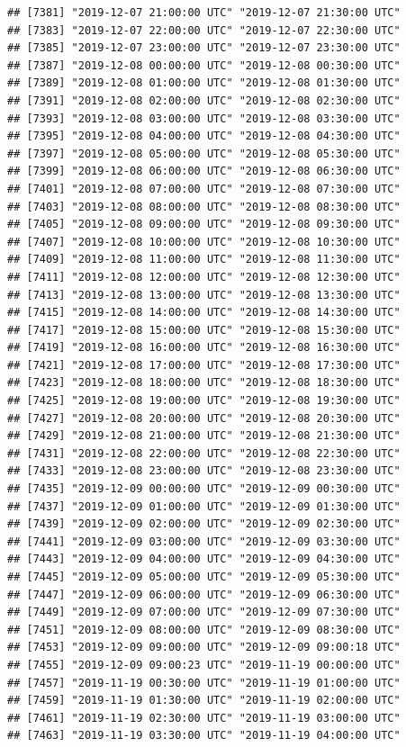 \documentclass{article}\usepackage[]{graphicx}\usepackage[]{color}
\makeatletter
\newenvironment{kframe}{%
 \def\at@end@of@kframe{}%
 \ifinner\ifhmode%
  \def\at@end@of@kframe{\end{minipage}}%
  \begin{minipage}{\columnwidth}%
 \fi\fi%
 \def\FrameCommand##1{\hskip\@totalleftmargin \hskip-\fboxsep
 \colorbox{shadecolor}{##1}\hskip-\fboxsep
     \hskip-\linewidth \hskip-\@totalleftmargin \hskip\columnwidth}%
 \MakeFramed {\advance\hsize-\width
   \@totalleftmargin\z@ \linewidth\hsize
   \@setminipage}}%
 {\par\unskip\endMakeFramed%
 \at@end@of@kframe}
\newenvironment{knitrout}{}{} %
\makeatother
\begin{document}
\begin{knitrout}
\begin{kframe}
\begin{verbatim}
## [7381] "2019-12-07 21:00:00 UTC" "2019-12-07 21:30:00 UTC"
## [7383] "2019-12-07 22:00:00 UTC" "2019-12-07 22:30:00 UTC"
## [7385] "2019-12-07 23:00:00 UTC" "2019-12-07 23:30:00 UTC"
## [7387] "2019-12-08 00:00:00 UTC" "2019-12-08 00:30:00 UTC"
## [7389] "2019-12-08 01:00:00 UTC" "2019-12-08 01:30:00 UTC"
## [7391] "2019-12-08 02:00:00 UTC" "2019-12-08 02:30:00 UTC"
## [7393] "2019-12-08 03:00:00 UTC" "2019-12-08 03:30:00 UTC"
## [7395] "2019-12-08 04:00:00 UTC" "2019-12-08 04:30:00 UTC"
## [7397] "2019-12-08 05:00:00 UTC" "2019-12-08 05:30:00 UTC"
## [7399] "2019-12-08 06:00:00 UTC" "2019-12-08 06:30:00 UTC"
## [7401] "2019-12-08 07:00:00 UTC" "2019-12-08 07:30:00 UTC"
## [7403] "2019-12-08 08:00:00 UTC" "2019-12-08 08:30:00 UTC"
## [7405] "2019-12-08 09:00:00 UTC" "2019-12-08 09:30:00 UTC"
## [7407] "2019-12-08 10:00:00 UTC" "2019-12-08 10:30:00 UTC"
## [7409] "2019-12-08 11:00:00 UTC" "2019-12-08 11:30:00 UTC"
## [7411] "2019-12-08 12:00:00 UTC" "2019-12-08 12:30:00 UTC"
## [7413] "2019-12-08 13:00:00 UTC" "2019-12-08 13:30:00 UTC"
## [7415] "2019-12-08 14:00:00 UTC" "2019-12-08 14:30:00 UTC"
## [7417] "2019-12-08 15:00:00 UTC" "2019-12-08 15:30:00 UTC"
## [7419] "2019-12-08 16:00:00 UTC" "2019-12-08 16:30:00 UTC"
## [7421] "2019-12-08 17:00:00 UTC" "2019-12-08 17:30:00 UTC"
## [7423] "2019-12-08 18:00:00 UTC" "2019-12-08 18:30:00 UTC"
## [7425] "2019-12-08 19:00:00 UTC" "2019-12-08 19:30:00 UTC"
## [7427] "2019-12-08 20:00:00 UTC" "2019-12-08 20:30:00 UTC"
## [7429] "2019-12-08 21:00:00 UTC" "2019-12-08 21:30:00 UTC"
## [7431] "2019-12-08 22:00:00 UTC" "2019-12-08 22:30:00 UTC"
## [7433] "2019-12-08 23:00:00 UTC" "2019-12-08 23:30:00 UTC"
## [7435] "2019-12-09 00:00:00 UTC" "2019-12-09 00:30:00 UTC"
## [7437] "2019-12-09 01:00:00 UTC" "2019-12-09 01:30:00 UTC"
## [7439] "2019-12-09 02:00:00 UTC" "2019-12-09 02:30:00 UTC"
## [7441] "2019-12-09 03:00:00 UTC" "2019-12-09 03:30:00 UTC"
## [7443] "2019-12-09 04:00:00 UTC" "2019-12-09 04:30:00 UTC"
## [7445] "2019-12-09 05:00:00 UTC" "2019-12-09 05:30:00 UTC"
## [7447] "2019-12-09 06:00:00 UTC" "2019-12-09 06:30:00 UTC"
## [7449] "2019-12-09 07:00:00 UTC" "2019-12-09 07:30:00 UTC"
## [7451] "2019-12-09 08:00:00 UTC" "2019-12-09 08:30:00 UTC"
## [7453] "2019-12-09 09:00:00 UTC" "2019-12-09 09:00:18 UTC"
## [7455] "2019-12-09 09:00:23 UTC" "2019-11-19 00:00:00 UTC"
## [7457] "2019-11-19 00:30:00 UTC" "2019-11-19 01:00:00 UTC"
## [7459] "2019-11-19 01:30:00 UTC" "2019-11-19 02:00:00 UTC"
## [7461] "2019-11-19 02:30:00 UTC" "2019-11-19 03:00:00 UTC"
## [7463] "2019-11-19 03:30:00 UTC" "2019-11-19 04:00:00 UTC"

\end{verbatim}
\end{kframe}
\end{knitrout}
\end{document}
